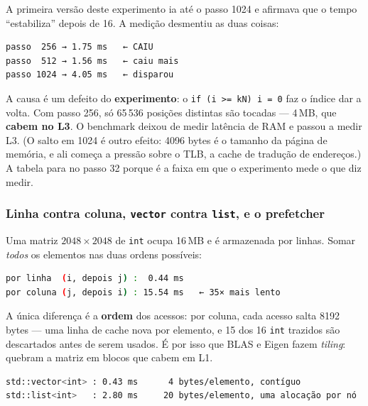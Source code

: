 \begin{armadilha}
A primeira versão deste experimento ia até o passo 1024 e afirmava que o tempo
``estabiliza'' depois de 16. A medição desmentiu as duas coisas:
\begin{lstlisting}[style=bt, language=bash, frame=none,
                   xleftmargin=0pt, xrightmargin=0pt]
passo  256 → 1.75 ms   ← CAIU
passo  512 → 1.56 ms   ← caiu mais
passo 1024 → 4.05 ms   ← disparou
\end{lstlisting}
A causa é um defeito do \textbf{experimento}: o \texttt{if (i >= kN) i = 0} faz o
índice dar a volta. Com passo 256, só 65\,536 posições distintas são tocadas ---
4\,MB, que \textbf{cabem no L3}. O benchmark deixou de medir latência de RAM e
passou a medir L3. (O salto em 1024 é outro efeito: 4096 bytes é o tamanho da
página de memória, e ali começa a pressão sobre o TLB, a cache de tradução de
endereços.) A tabela para no passo 32 porque é a faixa em que o experimento mede o
que diz medir.
\end{armadilha}

\subsubsection{Linha contra coluna, \texttt{vector} contra \texttt{list}, e o prefetcher}

Uma matriz $2048 \times 2048$ de \texttt{int} ocupa 16\,MB e é armazenada por
linhas. Somar \emph{todos} os elementos nas duas ordens possíveis:

\begin{lstlisting}[style=bt, language=bash,
    caption={Saída de \texttt{src/performance/}: mesmo $O(n^2)$, mesmo número de
             somas, 35 vezes de diferença.}]
por linha  (i, depois j) :  0.44 ms
por coluna (j, depois i) : 15.54 ms   ← 35× mais lento
\end{lstlisting}

A única diferença é a \textbf{ordem} dos acessos: por coluna, cada acesso salta
8192 bytes --- uma linha de cache nova por elemento, e 15 dos 16 \texttt{int}
trazidos são descartados antes de serem usados. É por isso que BLAS e Eigen fazem
\emph{tiling}: quebram a matriz em blocos que cabem em L1.

\begin{lstlisting}[style=bt, language=bash,
    caption={Saída de \texttt{src/performance/}: somando 2 milhões de \texttt{int}.}]
std::vector<int> : 0.43 ms      4 bytes/elemento, contíguo
std::list<int>   : 2.80 ms     20 bytes/elemento, uma alocação por nó
\end{lstlisting}

